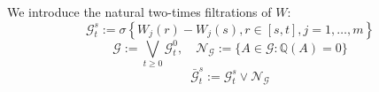 We introduce the natural two-times filtrations of $W:$
\[  \mathcal{G}_{t}^{s}:=\sigma\left\{W_{j}(r)-W_{j}(s), r \in[s, t], j=1, \ldots, m\right\} \]
\[ \mathcal{G}:=\bigvee_{t \geq 0} \mathcal{G}_{t}^{0}, \quad \mathcal{N}_{\mathcal{G}}:=\{A \in \mathcal{G}: \mathbb{Q}(A)=0\} \]
\[ \bar{\mathcal{G}}_{t}^{s}:=\mathcal{G}_{t}^{s} \vee \mathcal{N}_{\mathcal{G}}  \]

